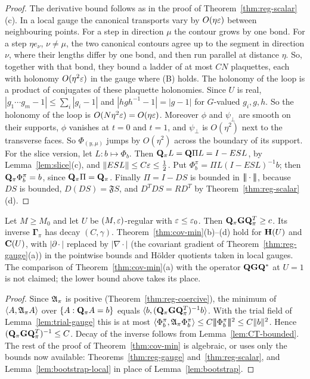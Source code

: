 \begin{proof}
The derivative bound follows as in the proof of Theorem~\ref{thm:reg-scalar}(c). In a local gauge the canonical transports vary by $O(\eta\varepsilon)$ between neighbouring points. For a step in direction $\mu$ the contour grows by one bond. For a step $\eta e_\nu$, $\nu\ne\mu$, the two canonical contours agree up to the segment in direction $\nu$, where their lengths differ by one bond, and then run parallel at distance $\eta$. So, together with that bond, they bound a ladder of at most $CN$ plaquettes, each with holonomy $O(\eta^2\varepsilon)$ in the gauge where (B) holds. The holonomy of the loop is a product of conjugates of these plaquette holonomies. Since $U$ is real, $|g_1\cdots g_m-1|\le\sum_i|g_i-1|$ and $|hgh^{-1}-1|=|g-1|$ for $G$-valued $g_i,g,h$. So the holonomy of the loop is $O(N\eta^2\varepsilon)=O(\eta\varepsilon)$. Moreover $\phi$ and $\psi_\perp$ are smooth on their supports, $\phi$ vanishes at $t=0$ and $t=1$, and $\psi_\perp$ is $O(\eta^2)$ next to the transverse faces. So $\Phi_{(y,\mu)}$ jumps by $O(\eta^2)$ across the boundary of its support. For the slice version, let $L:b\mapsto\Phi_b$. Then $\mathbf Q_\pi L=\mathbf Q\Pi L=I-ESL$, by Lemma~\ref{lem:slice}(c), and $\|ESL\|\le C\varepsilon\le\frac12$. Put $\Phi^\pi_b=\Pi L(I-ESL)^{-1}b$; then $\mathbf Q_\pi\Phi^\pi_b=b$, since $\mathbf Q_\pi\Pi=\mathbf Q_\pi$. Finally $\Pi=I-DS$ is bounded in $|\!|\!|\cdot|\!|\!|$, because $DS$ is bounded, $D(DS)=\mathfrak FS$, and $D^TDS=RD^T$ by Theorem~\ref{thm:reg-scalar}(d).
\end{proof}

\begin{theorem}\label{thm:reg-min}
Let $M\ge M_0$ and let $U$ be $(M,\varepsilon)$-regular with $\varepsilon\le\varepsilon_0$. Then $\mathbf Q_\pi\mathbf G\mathbf Q_\pi^T\ge c$. Its inverse $\boldsymbol\Gamma_\pi$ has decay $(C,\gamma)$. Theorem~\ref{thm:cov-min}(b)--(d) hold for $\mathbf H(U)$ and $\mathbf C(U)$, with $|\partial\cdot|$ replaced by $|\nabla\cdot|$ (the covariant gradient of Theorem~\ref{thm:reg-gauge}(a)) in the pointwise bounds and H\"older quotients taken in local gauges. The comparison of Theorem~\ref{thm:cov-min}(a) with the operator $\mathbf Q\mathbf G\mathbf Q^*$ at $U=1$ is not claimed; the lower bound above takes its place.
\end{theorem}

\begin{proof}
Since $\mathfrak A_\pi$ is positive (Theorem~\ref{thm:reg-coercive}), the minimum of $\langle A,\mathfrak A_\pi A\rangle$ over $\{A:\mathbf Q_\pi A=b\}$ equals $\langle b,(\mathbf Q_\pi\mathbf G\mathbf Q_\pi^T)^{-1}b\rangle$. With the trial field of Lemma~\ref{lem:trial-gauge} this is at most $\langle \Phi^\pi_b,\mathfrak A_\pi\Phi^\pi_b\rangle\le C|\!|\!|\Phi^\pi_b|\!|\!|^2\le C\|b\|^2$. Hence $(\mathbf Q_\pi\mathbf G\mathbf Q_\pi^T)^{-1}\le C$. Decay of the inverse follows from Lemma~\ref{lem:CT-bounded}. The rest of the proof of Theorem~\ref{thm:cov-min} is algebraic, or uses only the bounds now available: Theorems~\ref{thm:reg-gauge} and~\ref{thm:reg-scalar}, and Lemma~\ref{lem:bootstrap-local} in place of Lemma~\ref{lem:bootstrap}.
\end{proof}

